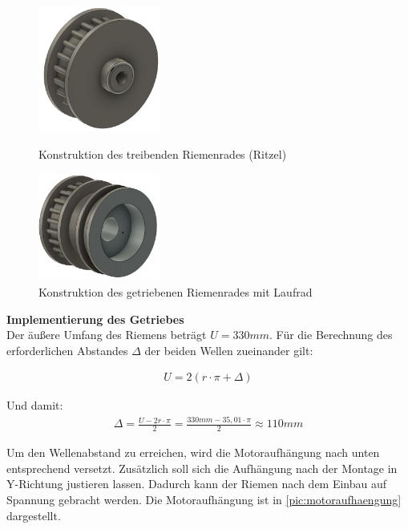 \begin{figure}[h]
	\centering
	\begin{minipage}[t]{0.45\linewidth}
		\centering
		\includegraphics[width=4cm]{ritzel.png}
		\caption{Konstruktion des treibenden Riemenrades (Ritzel)}
		\label{pic:ritzel}
	\end{minipage}
	\hfil	
	\begin{minipage}[t]{0.45\linewidth}
		\centering
		\includegraphics[width=4cm]{riemenlaufrad.png}
		\caption{Konstruktion des getriebenen Riemenrades mit Laufrad}
		\label{pic:riemenlaufrad}
	\end{minipage}	
\end{figure}



\newpage


\textbf{Implementierung des Getriebes}\\
Der äußere Umfang des Riemens beträgt $U = 330mm$. Für die Berechnung des erforderlichen Abstandes $\Delta$ der beiden Wellen zueinander gilt:

\begin{align}
	U = 2 (r \cdot \pi+ \Delta) 
\end{align}

Und damit: 
\begin{align}	
	\Delta = \frac{U - 2r \cdot \pi}{2} = \frac{330mm - 35,01 \cdot \pi}{2} \approx 110mm 
\end{align}

Um den Wellenabstand zu erreichen, wird die Motoraufhängung nach unten entsprechend versetzt. Zusätzlich soll sich die Aufhängung nach der Montage in Y-Richtung justieren lassen. Dadurch kann der Riemen nach dem Einbau auf Spannung gebracht werden. Die Motoraufhängung ist in \autoref{pic:motoraufhaengung} dargestellt. 


